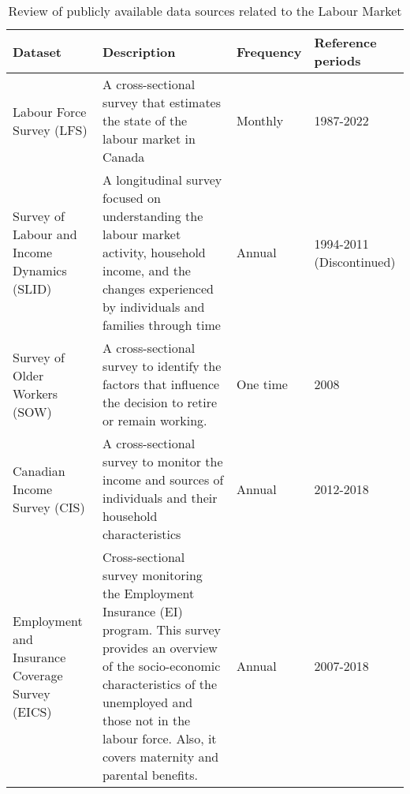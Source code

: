 \renewcommand{\arraystretch}{1.5}
\begin{table}[H]
    \begin{tabular}{p{4cm}p{7cm}p{2.5cm}p{2.5cm}}
        \textbf{Dataset} & \textbf{Description} & \textbf{Frequency} & \textbf{Reference periods} \\
        \hline
        \rowcolor{lightgray} Labour Force Survey (LFS) & A cross-sectional survey that estimates the state of the labour market in Canada & Monthly & 1987-2022 \\
        
        Survey of Labour and Income Dynamics (SLID) & A longitudinal survey focused on understanding the labour market activity, household income, and the changes experienced by individuals and families through time & Annual & 1994-2011 (Discontinued) \\

        \rowcolor{lightgray} Survey of Older Workers (SOW) & A cross-sectional survey to identify the factors that influence the decision to retire or remain working. & One time & 2008 \\

        Canadian Income Survey (CIS) & A cross-sectional survey to monitor the income and sources of individuals and their household characteristics & Annual & 2012-2018 \\

        \rowcolor{lightgray} Employment and Insurance Coverage Survey (EICS) & Cross-sectional survey monitoring the Employment Insurance (EI) program. This survey provides an overview of the socio-economic characteristics of the unemployed and those not in the labour force. Also, it covers maternity and parental benefits. & Annual & 2007-2018 \\
        \hline
    \end{tabular}
    \caption{\label{table:datasource} Review of publicly available data sources related to the Labour Market}
\end{table}













